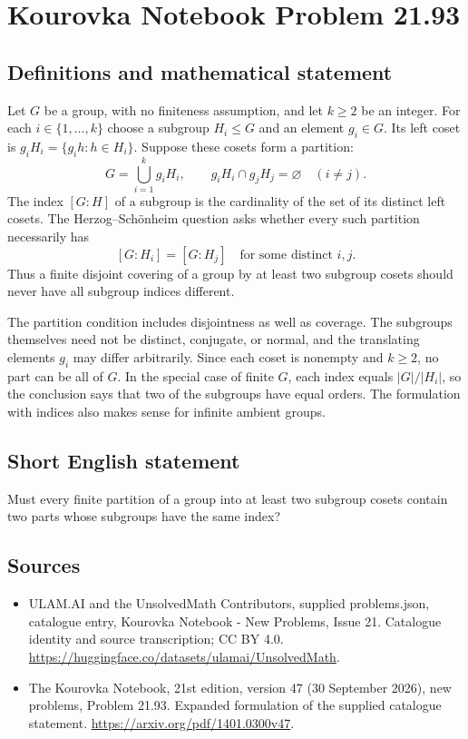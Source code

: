 \documentclass[11pt,a4paper]{article}
\begin{document}
\section*{Kourovka Notebook Problem 21.93}\label{statement}

\subsection{Definitions and mathematical statement}
Let $G$ be a group, with no finiteness assumption, and let $k\ge2$ be an integer. For each $i\in\{1,\ldots,k\}$ choose a subgroup $H_i\le G$ and an element $g_i\in G$. Its left coset is $g_iH_i=\{g_ih:h\in H_i\}$. Suppose these cosets form a partition:
\[
 G=\bigcup_{i=1}^{k}g_iH_i,
 \qquad g_iH_i\cap g_jH_j=\varnothing\quad(i\ne j).
\]
The index $[G:H]$ of a subgroup is the cardinality of the set of its distinct left cosets. The Herzog--Sch\"onheim question asks whether every such partition necessarily has
\[
 [G:H_i]=[G:H_j]\quad\text{for some distinct }i,j.
\]
Thus a finite disjoint covering of a group by at least two subgroup cosets should never have all subgroup indices different.

The partition condition includes disjointness as well as coverage. The subgroups themselves need not be distinct, conjugate, or normal, and the translating elements $g_i$ may differ arbitrarily. Since each coset is nonempty and $k\ge2$, no part can be all of $G$. In the special case of finite $G$, each index equals $|G|/|H_i|$, so the conclusion says that two of the subgroups have equal orders. The formulation with indices also makes sense for infinite ambient groups.
\subsection{Short English statement}
Must every finite partition of a group into at least two subgroup cosets contain two parts whose subgroups have the same index?
\subsection{Sources}
\begin{itemize}
\item[S1] ULAM.AI and the UnsolvedMath Contributors, supplied problems.json, catalogue entry, Kourovka Notebook - New Problems, Issue 21. Catalogue identity and source transcription; CC BY 4.0.
\url{https://huggingface.co/datasets/ulamai/UnsolvedMath}.
\item[S2] The Kourovka Notebook, 21st edition, version 47 (30 September 2026), new problems, Problem 21.93. Expanded formulation of the supplied catalogue statement.
\url{https://arxiv.org/pdf/1401.0300v47}.
\end{itemize}
\end{document}
